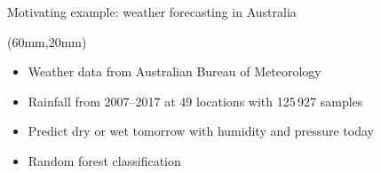 \documentclass{beamer}
\begin{document}
\begin{frame}{Motivating example: weather forecasting in Australia}

  \begin{textblock*}{63mm}(60mm,20mm)
    \begin{itemize}
      \item<1> Weather data from Australian Bureau of Meteorology
        \nocite{bureau2017daily}
      \item<1> Rainfall from 2007--2017 at 49 locations
        with 125\,927 samples
      \item<1> Predict \textcolor{drycolor}{dry} or
        \textcolor{wetcolor}{wet} tomorrow
        with humidity and pressure today
      \item<1> Random forest classification
    \end{itemize}
  \end{textblock*}


\end{frame}
\end{document}
